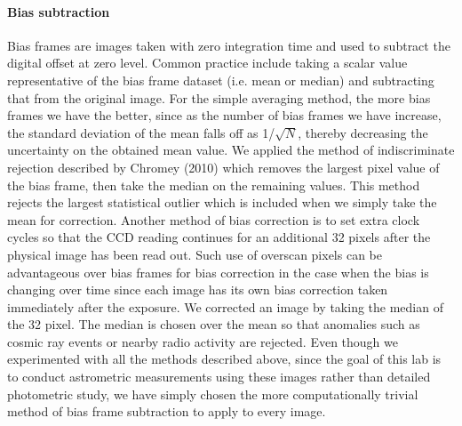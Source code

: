\documentclass[authoryear, 12pt,5p, times]{elsarticle}
\begin{document}
\paragraph{\textbf{Bias subtraction}}
Bias frames are images taken with zero integration time and used to subtract the digital offset at zero level. Common practice include taking a scalar value representative of the bias frame dataset (i.e. mean or median) and subtracting that from the original image. For the simple averaging method, the more bias frames we have the better, since as the number of bias frames we have increase, the standard deviation of the mean falls off as 1/$\sqrt{N}$, thereby decreasing the uncertainty on the obtained mean value.  We applied the method of indiscriminate rejection described by Chromey (2010) which removes the largest pixel value of the bias frame, then take the median on the remaining values. This method rejects the largest statistical outlier which is included when we simply take the mean for correction. Another method of bias correction is to set extra clock cycles so that the CCD reading continues for an additional 32 pixels after the physical image has been read out. Such  use of overscan pixels can be advantageous over bias frames for bias correction in the case when the bias is changing over time since each image has its own bias correction taken immediately after the exposure. We corrected an image by taking the median of the 32 pixel. The median is chosen over the mean so that anomalies such as cosmic ray events or nearby radio activity are rejected. Even though we experimented with all the methods described above, since the goal of this lab is to conduct astrometric measurements using these images rather than detailed photometric study,  we have simply chosen the more computationally trivial method of bias frame subtraction to apply to every image. 			
\end{document}
